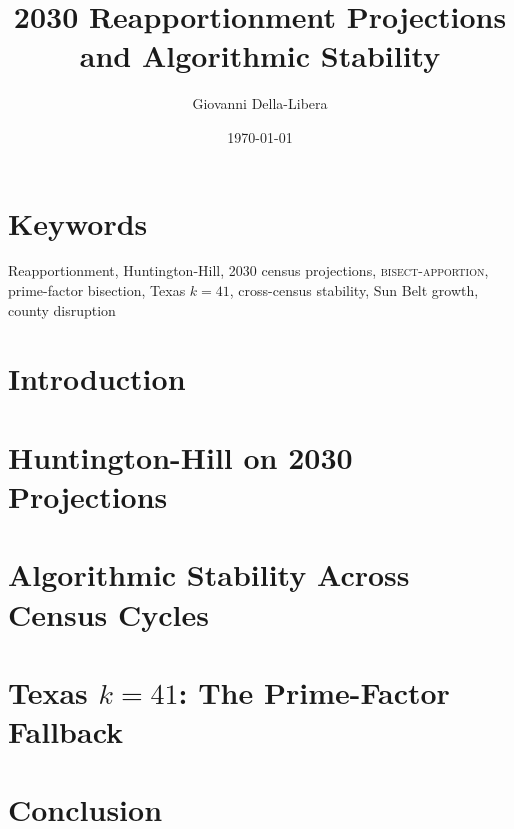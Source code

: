 \documentclass[12pt]{article}
\title{\textbf{2030 Reapportionment Projections and Algorithmic Stability}}
\author{Giovanni Della-Libera}
\date{\today}
\begin{document}
\maketitle

\begin{abstract}

\end{abstract}

\section*{Keywords}
Reapportionment, Huntington-Hill, 2030 census projections, \textsc{bisect-apportion},
prime-factor bisection, Texas $k=41$, cross-census stability, Sun Belt growth,
county disruption

\section{Introduction}


\section{Huntington-Hill on 2030 Projections}


\section{Algorithmic Stability Across Census Cycles}


\section{Texas $k=41$: The Prime-Factor Fallback}


\section{Conclusion}




\end{document}

